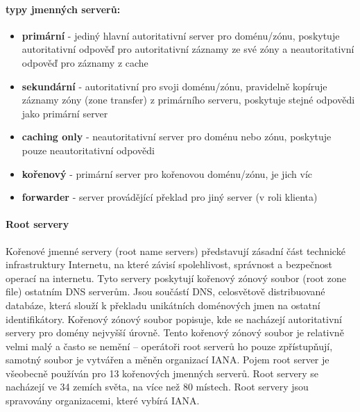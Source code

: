 \documentclass[10pt,a4paper]{article}
\begin{document}
\paragraph{typy jmenných serverů:}
\begin{itemize}
	\item \textbf{primární} - jediný hlavní autoritativní server pro doménu/zónu, poskytuje autoritativní odpověď pro autoritativní záznamy ze své zóny a neautoritativní odpověď pro záznamy z cache
	\item \textbf{sekundární} - autoritativní pro svoji doménu/zónu, pravidelně kopíruje záznamy zóny (zone transfer) z primárního serveru, poskytuje stejné odpovědi jako primární server
	\item \textbf{caching only} - neautoritativní server pro doménu nebo zónu, poskytuje pouze neautoritativní odpovědi
	\item \textbf{kořenový} - primární server pro kořenovou doménu/zónu, je jich víc
	\item \textbf{forwarder} - server provádějící překlad pro jiný server (v roli klienta)
\end{itemize}
\paragraph{Root servery} Kořenové jmenné servery (root name servers) představují zásadní část technické infrastruktury Internetu, na které závisí spolehlivost, správnost a bezpečnost operací na internetu. Tyto servery poskytují kořenový zónový soubor (root zone file) ostatním DNS serverům. Jsou součástí DNS, celosvětově distribuované databáze, která slouží k překladu unikátních doménových jmen na ostatní identifikátory. Kořenový zónový soubor popisuje, kde se nacházejí autoritativní servery pro domény nejvyšší úrovně. Tento kořenový zónový soubor je relativně velmi malý a často se nemění – operátoři root serverů ho pouze zpřístupňují, samotný soubor je vytvářen a měněn organizací IANA. Pojem root server je všeobecně používán pro 13 kořenových jmenných serverů. Root servery se nacházejí ve 34 zemích světa, na více než 80 místech. Root servery jsou spravovány organizacemi, které vybírá IANA.
\end{document}
